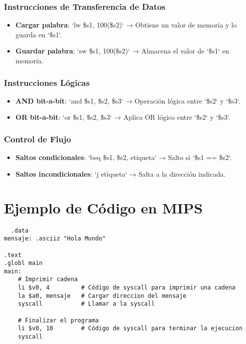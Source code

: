 \documentclass{article}
\begin{document}
\subsubsection{Instrucciones de Transferencia de Datos}
\begin{itemize}
    \item \textbf{Cargar palabra}: `lw \$s1, 100(\$s2)` → Obtiene un valor de memoria y lo guarda en `\$s1`.
    \item \textbf{Guardar palabra}: `sw \$s1, 100(\$s2)` → Almacena el valor de `\$s1` en memoria.
\end{itemize}

\subsubsection{Instrucciones Lógicas}
\begin{itemize}
    \item \textbf{AND bit-a-bit}: `and \$s1, \$s2, \$s3` → Operación lógica entre `\$s2` y `\$s3`.
    \item \textbf{OR bit-a-bit}: `or \$s1, \$s2, \$s3` → Aplica OR lógico entre `\$s2` y `\$s3`.
\end{itemize}

\subsubsection{Control de Flujo}
\begin{itemize}
    \item \textbf{Saltos condicionales}: `beq \$s1, \$s2, etiqueta` → Salto si `\$s1 == \$s2`.
    \item \textbf{Saltos incondicionales}: `j etiqueta` → Salta a la dirección indicada.
\end{itemize}

\section{Ejemplo de Código en MIPS}
\begin{lstlisting}
  .data
mensaje: .asciiz "Hola Mundo"

.text
.globl main
main:
    # Imprimir cadena
    li $v0, 4         # Código de syscall para imprimir una cadena
    la $a0, mensaje   # Cargar direccion del mensaje
    syscall           # Llamar a la syscall

    # Finalizar el programa
    li $v0, 10        # Código de syscall para terminar la ejecucion
    syscall

\end{lstlisting}
\end{document}
